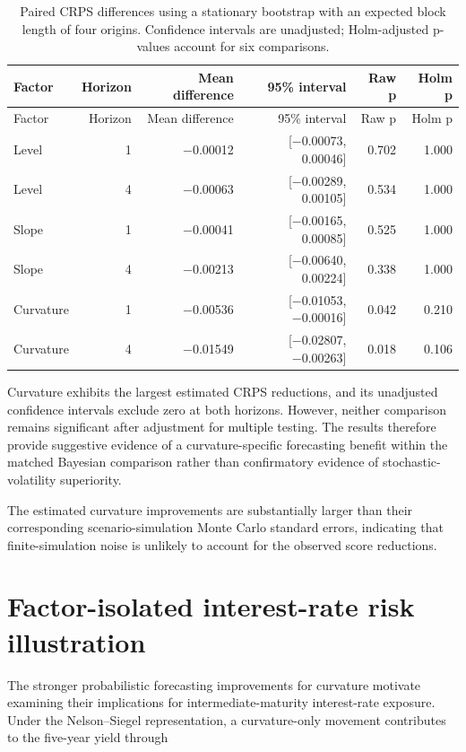 \documentclass[
  12pt,
  letterpaper,
  DIV=11,
  numbers=noendperiod]{scrreprt}
\begin{document}
\begin{longtable}[]{@{}lrrrrr@{}}
\caption{Paired CRPS differences using a stationary bootstrap with an
expected block length of four origins. Confidence intervals are
unadjusted; Holm-adjusted p-values account for six
comparisons.}\label{tbl-factor-paired}\tabularnewline
\toprule\noalign{}
Factor & Horizon & Mean difference & 95\% interval & Raw p & Holm p \\
\midrule\noalign{}
\endfirsthead
\toprule\noalign{}
Factor & Horizon & Mean difference & 95\% interval & Raw p & Holm p \\
\midrule\noalign{}
\endhead
\bottomrule\noalign{}
\endlastfoot
Level & 1 & −0.00012 & {[}−0.00073, 0.00046{]} & 0.702 & 1.000 \\
Level & 4 & −0.00063 & {[}−0.00289, 0.00105{]} & 0.534 & 1.000 \\
Slope & 1 & −0.00041 & {[}−0.00165, 0.00085{]} & 0.525 & 1.000 \\
Slope & 4 & −0.00213 & {[}−0.00640, 0.00224{]} & 0.338 & 1.000 \\
Curvature & 1 & −0.00536 & {[}−0.01053, −0.00016{]} & 0.042 & 0.210 \\
Curvature & 4 & −0.01549 & {[}−0.02807, −0.00263{]} & 0.018 & 0.106 \\
\end{longtable}

Curvature exhibits the largest estimated CRPS reductions, and its
unadjusted confidence intervals exclude zero at both horizons. However,
neither comparison remains significant after adjustment for multiple
testing. The results therefore provide suggestive evidence of a
curvature-specific forecasting benefit within the matched Bayesian
comparison rather than confirmatory evidence of stochastic-volatility
superiority.

The estimated curvature improvements are substantially larger than their
corresponding scenario-simulation Monte Carlo standard errors,
indicating that finite-simulation noise is unlikely to account for the
observed score reductions.

\section{Factor-isolated interest-rate risk
illustration}\label{factor-isolated-interest-rate-risk-illustration}

The stronger probabilistic forecasting improvements for curvature
motivate examining their implications for intermediate-maturity
interest-rate exposure. Under the Nelson--Siegel representation, a
curvature-only movement contributes to the five-year yield through
\end{document}
